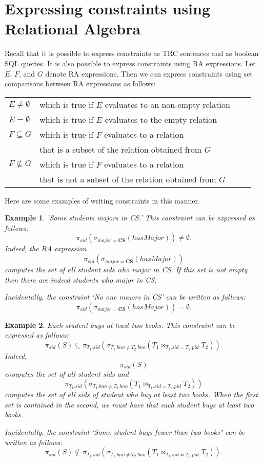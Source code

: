 \documentclass[11pt]{article}
\newcommand{\blue}[1]{{\color{blue}#1}}
\newtheorem{example}{Example}
\begin{document}
\newpage
\section{Expressing constraints using Relational Algebra}

Recall that it is possible to express constraints as TRC sentences and as boolean SQL queries. It is also possible to express constraints using RA expressions. Let $E$, $F$, and $G$  denote RA expressions. Then we can express constraints using set comparisons between RA expressions as follows:
\begin{center}
\begin{tabular}{llll}
$E \not=\emptyset$ & which is true if $E$ evaluates to an \blue{non-empty} relation \\
$E = \emptyset$ & which is true if $E$ evaluates to the \blue{empty} relation \\
$F \subseteq G$ & which is true if $F$ evaluates to a relation \\
&that is a \blue{subset} of the relation obtained from $G$\\ 
$F \not\subseteq G$ & which is true if $F$ evaluates to a relation \\
&that is \blue{not} a \blue{subset} of the relation obtained from $G$\\ 
\end{tabular}
\end{center}

Here are some examples of writing constraints in this manner.

\begin{example}\label{constraintOne}
`\emph{Some students majors in CS}.'  This constraint can be expressed as follows:
\[\pi_{sid}(\sigma_{major = \mathbf{CS}}(hasMajor)) \neq \emptyset.
\]
Indeed,  the RA expression 
\[\pi_{sid}(\sigma_{major = \mathbf{CS}}(hasMajor))\] 
computes the set of all student sids who major in CS.   If this set is not empty then there are indeed students who major in CS.

Incidentally, the constraint `\emph{No one majors in CS}' can be written as follows:
\[\pi_{sid}(\sigma_{major = \mathbf{CS}}(hasMajor)) = \emptyset.
\]
\end{example}

\begin{example}\label{constraintTwo}
\emph{Each student buys at least two books}.   This constraint can be expressed as follows:
\[\pi_{sid}(S) \subseteq \pi_{T_1.sid}(\sigma_{T_1.bno \neq T_2.bno}(T_1\bowtie_{T_1.sid = T_2.pid} T_2)).
\]
Indeed, \[\pi_{sid}(S)\] computes the set of all student sids and
\[\pi_{T_1.sid}(\sigma_{T_1.bno \neq T_2.bno}(T_1\bowtie_{T_1.sid = T_2.pid} T_2))\] computes the set of all sids of student who buy at least two books.    When the first set is contained in the second, we must have that each student buys at least two books.

Incidentally, the constraint `\emph{Some student buys fewer than two books}" can be written as follows:
\[\pi_{sid}(S) \not\subseteq \pi_{T_1.sid}(\sigma_{T_1.bno \neq T_2.bno}(T_1\bowtie_{T_1.sid = T_2.pid} T_2)).
\]

\end{example}
\end{document}
